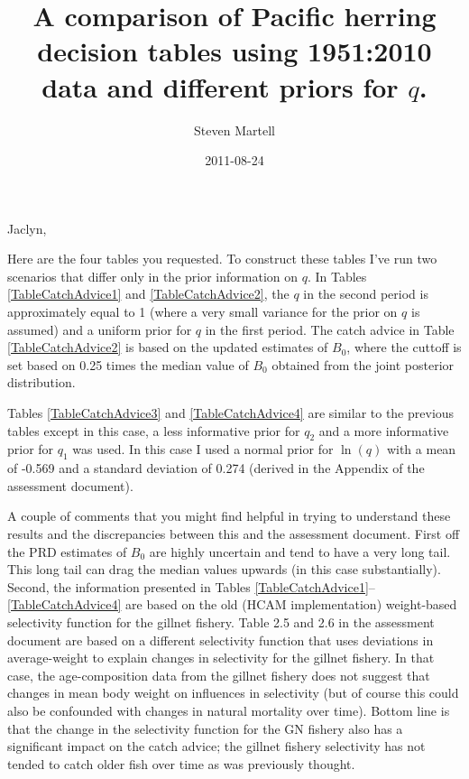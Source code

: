 \documentclass[]{article}
\title{A comparison of Pacific herring decision tables using 1951:2010 data and different priors for $q$.}
\author{Steven Martell}
\date{2011-08-24}
\begin{document}
\ifpdf
{}
\else
{}
\fi

\maketitle
Jaclyn,

Here are the four tables you requested.  To construct these tables I've run two scenarios that differ only in the prior information on $q$.  In Tables \ref{TableCatchAdvice1} and \ref{TableCatchAdvice2}, the $q$ in the second period is approximately equal to 1 (where a very small variance for the prior on $q$ is assumed) and a uniform prior for $q$ in the first period.  The catch advice in Table \ref{TableCatchAdvice2} is based on the updated estimates of $B_0$, where the cuttoff is set based on 0.25 times the median value of $B_0$ obtained from the joint posterior distribution.

Tables \ref{TableCatchAdvice3} and \ref{TableCatchAdvice4} are similar to the previous tables except in this case, a less informative prior for $q_2$ and a more informative prior for $q_1$ was used.  In this case I used a normal prior for $\ln(q)$ with a mean of -0.569 and a standard deviation of 0.274 (derived in the Appendix of the assessment document).

A couple of comments that you might find helpful in trying to understand these results and the discrepancies between this and the assessment document.  First off the PRD estimates of $B_0$ are highly uncertain and tend to have a very long tail. This long tail can drag the median values upwards (in this case substantially).  Second, the information presented in Tables \ref{TableCatchAdvice1}--\ref{TableCatchAdvice4} are based on the old (HCAM implementation) weight-based selectivity function for the gillnet fishery.  Table 2.5 and 2.6 in the assessment document are based on a different selectivity function that uses deviations in average-weight to explain changes in selectivity for the gillnet fishery.  In that case, the age-composition data from the gillnet fishery does not suggest that changes in mean body weight on influences in selectivity (but of course this could also be confounded with changes in natural mortality over time).  Bottom line is that the change in the selectivity function for the GN fishery also has a significant impact on the catch advice; the gillnet fishery selectivity has not tended to catch older fish over time as was previously thought.
\end{document}
